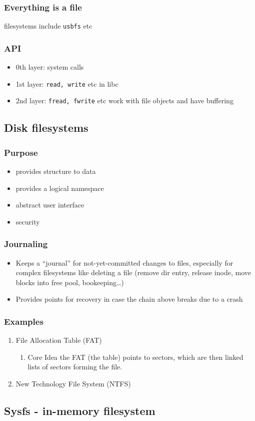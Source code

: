\documentclass[11pt]{article}
\begin{document}
\subsubsection{Everything is a file}
\label{sec:org3d6d4c9}
filesystems include \texttt{usbfs} etc
\subsubsection{API}
\label{sec:orgbbbf9a0}
\begin{itemize}
\item 0th layer: system calls
\item 1st layer: \texttt{read, write} etc in libc
\item 2nd layer: \texttt{fread, fwrite} etc work with file objects and have buffering
\end{itemize}
\subsection{Disk filesystems}
\label{sec:org31c577b}
\subsubsection{Purpose}
\label{sec:org4e217d1}
\begin{itemize}
\item provides structure to data
\item provides a logical namespace
\item abstract user interface
\item security
\end{itemize}
\subsubsection{Journaling}
\label{sec:org8f6bdec}
\begin{itemize}
\item Keeps a ``journal'' for not-yet-committed changes to files, especially for
complex filesystems like deleting a file (remove dir entry, release inode,
move blocks into free pool, bookeeping\ldots{})
\item Provides points for recovery in case the chain above breaks due to a crash
\end{itemize}
\subsubsection{Examples}
\label{sec:orgf7afe80}
\begin{enumerate}
\item File Allocation Table (FAT)
\label{sec:org8a9610e}
\begin{enumerate}
\item Core Idea
\label{sec:orgc0f5e10}
the FAT (the table) points to sectors, which are then linked lists of sectors
forming the file.
\end{enumerate}
\item New Technology File System (NTFS)
\label{sec:org9cc3da6}
\end{enumerate}
\subsection{Sysfs - in-memory filesystem}
\label{sec:org67bbd35}
\end{document}
